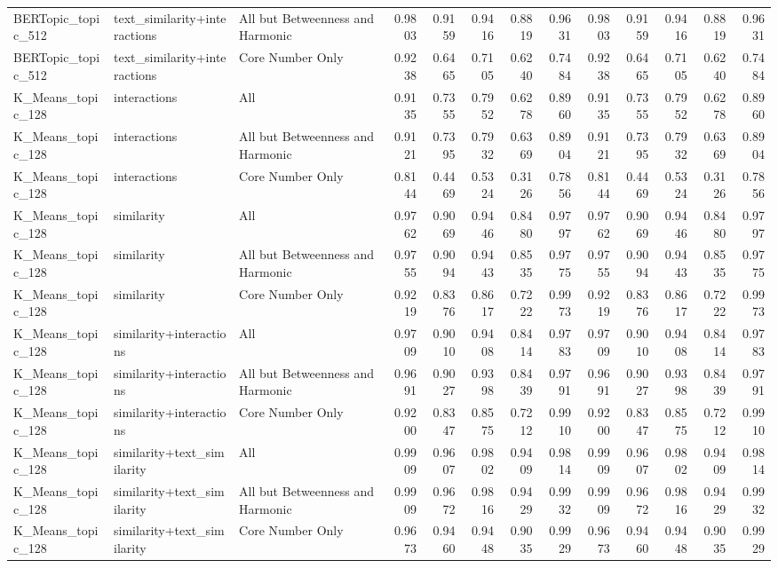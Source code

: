 \begin{tabular}{lllrrrrrrrrrr}
BERTopic_topic_512 & text_similarity+interactions & All but Betweenness and Harmonic & 0.9803 & 0.9159 & 0.9416 & 0.8819 & 0.9631 & 0.9803 & 0.9159 & 0.9416 & 0.8819 & 0.9631 \\
BERTopic_topic_512 & text_similarity+interactions & Core Number Only & 0.9238 & 0.6465 & 0.7105 & 0.6240 & 0.7484 & 0.9238 & 0.6465 & 0.7105 & 0.6240 & 0.7484 \\
K_Means_topic_128 & interactions & All & 0.9135 & 0.7355 & 0.7952 & 0.6278 & 0.8960 & 0.9135 & 0.7355 & 0.7952 & 0.6278 & 0.8960 \\
K_Means_topic_128 & interactions & All but Betweenness and Harmonic & 0.9121 & 0.7395 & 0.7932 & 0.6369 & 0.8904 & 0.9121 & 0.7395 & 0.7932 & 0.6369 & 0.8904 \\
K_Means_topic_128 & interactions & Core Number Only & 0.8144 & 0.4469 & 0.5324 & 0.3126 & 0.7856 & 0.8144 & 0.4469 & 0.5324 & 0.3126 & 0.7856 \\
K_Means_topic_128 & similarity & All & 0.9762 & 0.9069 & 0.9446 & 0.8480 & 0.9797 & 0.9762 & 0.9069 & 0.9446 & 0.8480 & 0.9797 \\
K_Means_topic_128 & similarity & All but Betweenness and Harmonic & 0.9755 & 0.9094 & 0.9443 & 0.8535 & 0.9775 & 0.9755 & 0.9094 & 0.9443 & 0.8535 & 0.9775 \\
K_Means_topic_128 & similarity & Core Number Only & 0.9219 & 0.8376 & 0.8617 & 0.7222 & 0.9973 & 0.9219 & 0.8376 & 0.8617 & 0.7222 & 0.9973 \\
K_Means_topic_128 & similarity+interactions & All & 0.9709 & 0.9010 & 0.9408 & 0.8414 & 0.9783 & 0.9709 & 0.9010 & 0.9408 & 0.8414 & 0.9783 \\
K_Means_topic_128 & similarity+interactions & All but Betweenness and Harmonic & 0.9691 & 0.9027 & 0.9398 & 0.8439 & 0.9791 & 0.9691 & 0.9027 & 0.9398 & 0.8439 & 0.9791 \\
K_Means_topic_128 & similarity+interactions & Core Number Only & 0.9200 & 0.8347 & 0.8575 & 0.7212 & 0.9910 & 0.9200 & 0.8347 & 0.8575 & 0.7212 & 0.9910 \\
K_Means_topic_128 & similarity+text_similarity & All & 0.9909 & 0.9607 & 0.9802 & 0.9409 & 0.9814 & 0.9909 & 0.9607 & 0.9802 & 0.9409 & 0.9814 \\
K_Means_topic_128 & similarity+text_similarity & All but Betweenness and Harmonic & 0.9909 & 0.9672 & 0.9816 & 0.9429 & 0.9932 & 0.9909 & 0.9672 & 0.9816 & 0.9429 & 0.9932 \\
K_Means_topic_128 & similarity+text_similarity & Core Number Only & 0.9673 & 0.9460 & 0.9448 & 0.9035 & 0.9929 & 0.9673 & 0.9460 & 0.9448 & 0.9035 & 0.9929 \\

\end{tabular}

